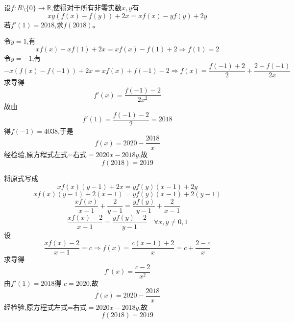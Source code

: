 \begin{questions}
    \question 设$f:R\setminus\{0\}\to \mathbb{R}$,使得对于所有非零实数$x, y$有
    \[
    xy(f(x) - f(y)) + 2x = xf(x) - yf(y) + 2y
    \]
    若$f'(1) = 2018$,求$f(2018)$。
    \begin{solution}
        令$y=1$,有
        \[
        xf(x) - xf(1) + 2x= xf(x) - f(1) + 2 \Rightarrow f(1)=2
        \] 
        令$y=-1$,有
        \[
        -x(f(x) - f(-1)) + 2x = xf(x) + f(-1) -2 \Rightarrow f(x) = \frac{f(-1) + 2}{2} + \frac{2 - f(-1)}{2x}
        \]
        求导得
        \[
        f'(x) = \frac{f(-1) - 2}{2x^2} 
        \]
        故由
        \[
        f'(1) = \frac{f(-1) - 2}{2} = 2018
        \]
        得$f(-1)=4038$,于是
        \[
        f(x)=2020-\frac{2018}{x}
        \]
        经检验,原方程式左式=右式$=2020x-2018y$,故
        \[
        f(2018)=2019
        \]
    \end{solution}
    \begin{solution}
        将原式写成
        \[
        xf(x) (y-1) + 2x = yf(y) (x-1) + 2y 
        \]
        \[
        xf(x)(y-1) + 2(x-1) = yf(y)(x-1) + 2(y-1)
        \]
        \[
        \frac{xf(x)}{x-1} + \frac{2}{y-1} = \frac{yf(y)}{y-1} + \frac{2}{x-1}
        \]
        \[
        \frac{xf(x)-2}{x-1} = \frac{yf(y)-2}{y-1} \quad \forall x, y \neq 0, 1
        \]
        设
        \[
        \frac{xf(x)-2}{x-1} = c \Rightarrow f(x) = \frac{c(x-1)+2}{x} = c + \frac{2-c}{x}
        \]  
        求导得
        \[
        f'(x) = \frac{c-2}{x^2} 
        \]
        由$f'(1) = 2018$得 $c=2020$,故
        \[
        f(x)=2020-\frac{2018}{x}
        \]
        经检验,原方程式左式=右式$=2020x-2018y$,故
        \[
        f(2018)=2019
        \]
    \end{solution}
    

\end{questions}
